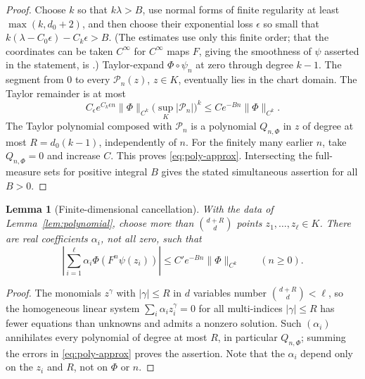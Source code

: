 \documentclass[12pt]{article}
\newtheorem{lemma}[theorem]{Lemma}
\theoremstyle{remark}
\begin{document}
\begin{proof}
Choose \(k\) so that \(k\lambda>B\), use normal forms of finite
regularity at least \(\max(k,d_0+2)\), and then choose their exponential
loss \(\epsilon\) so small that \(k(\lambda-C_0\epsilon)-C_k\epsilon>B\).
(The estimates use only this finite order; that the coordinates can
be taken \(C^\infty\) for \(C^\infty\) maps \(F\), giving the
smoothness of \(\psi\) asserted in the statement, is
\cite[Corollary~2.4]{KalininSadovskaya2017}.)
Taylor-expand \(\Phi\circ\psi_n\) at zero through degree \(k-1\).
The segment from \(0\) to every \(\mathcal P_n(z)\), \(z\in K\),
eventually lies in the chart domain.  The Taylor remainder is at most
\[
 C_\epsilon e^{C_k\epsilon n}\|\Phi\|_{C^k}
            \bigl(\sup_K|\mathcal P_n|\bigr)^k
 \le C e^{-Bn}\|\Phi\|_{C^k}.
\]
The Taylor polynomial composed with \(\mathcal P_n\) is a polynomial
\(Q_{n,\Phi}\) in \(z\) of degree at most
\(R=d_0(k-1)\), independently of \(n\).
For the finitely many earlier \(n\), take \(Q_{n,\Phi}=0\) and
increase \(C\).  This proves \eqref{eq:poly-approx}.
Intersecting the full-measure sets for positive integral \(B\)
gives the stated simultaneous assertion for all \(B>0\).
\end{proof}

\begin{lemma}[Finite-dimensional cancellation]\label{lem:finite}
With the data of Lemma~\ref{lem:polynomial}, choose more than
\(\binom{d+R}{d}\) points \(z_1,\ldots,z_\ell\in K\).
There are real coefficients \(\alpha_i\), not all zero, such that
\begin{equation}\label{eq:finite}
 \left|\sum_{i=1}^{\ell}\alpha_i\Phi(F^n\psi(z_i))\right|
      \le C' e^{-Bn}\|\Phi\|_{C^k}\qquad(n\ge0).
\end{equation}
\end{lemma}
\begin{proof}
The monomials \(z^\gamma\) with \(|\gamma|\le R\) in \(d\) variables
number \(\binom{d+R}{d}<\ell\), so the homogeneous linear system
\(\sum_i\alpha_i z_i^\gamma=0\) for all multi-indices \(|\gamma|\le R\) has
fewer equations than unknowns and admits a nonzero solution.
Such \((\alpha_i)\) annihilates every polynomial of degree at most
\(R\), in particular \(Q_{n,\Phi}\); summing the errors in
\eqref{eq:poly-approx} proves the assertion.  Note that the
\(\alpha_i\) depend only on the \(z_i\) and \(R\), not on \(\Phi\)
or \(n\).
\end{proof}
\end{document}

